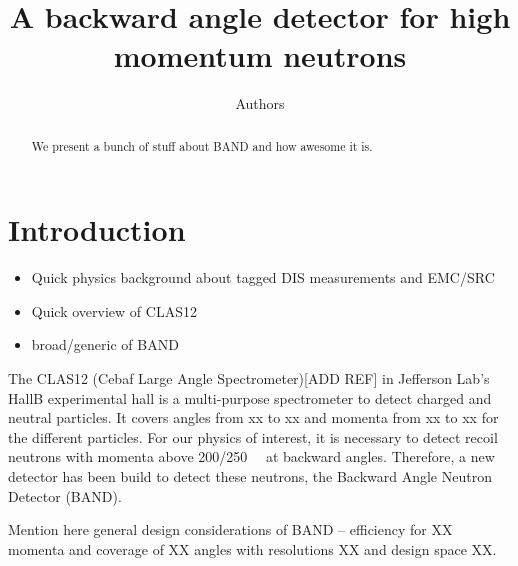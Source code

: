 \documentclass[review]{elsarticle}
\begin{document}
\begin{frontmatter}

\title{A backward angle detector for high momentum neutrons}

\author{Authors}
\address{Addresses}

\author[]{}
\ead[]{}

\begin{abstract}
We present a bunch of stuff about BAND and how awesome it is.
\end{abstract}

\begin{keyword}
\end{keyword}
\end{frontmatter}

\linenumbers

\section{Introduction}
\begin{itemize}
\item Quick physics background about tagged DIS measurements and EMC/SRC
\item Quick overview of CLAS12
\item broad/generic of BAND
\end{itemize}


The CLAS12 (Cebaf Large Angle Spectrometer)[ADD REF] in Jefferson Lab's HallB experimental hall is a multi-purpose spectrometer to detect charged and neutral particles. It covers angles from xx to xx and momenta from xx to xx for the different particles. For our physics of interest, it is necessary to detect recoil neutrons with momenta above \SI{200/250}{\mega\eVperc} at backward angles. Therefore, a new detector has been build to detect these neutrons, the Backward Angle Neutron Detector (BAND). 

Mention here general design considerations of BAND -- efficiency for XX momenta and coverage of XX angles with resolutions XX and design space XX.

\end{document}

